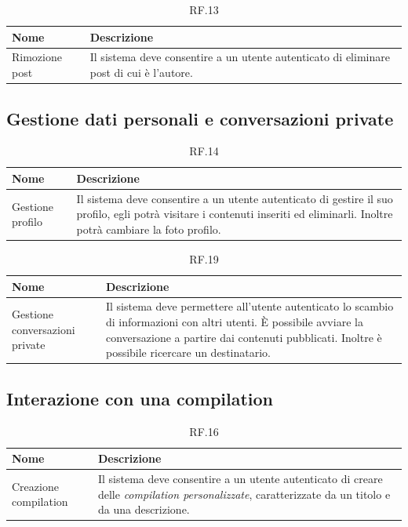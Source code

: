 \documentclass{natourDoc}
\begin{document}
	\begin{table}[H]
		\centering
		\begin{tabular}{ |p{5cm}|p{10.3cm}| }
			\hline
			\rowcolor{PineGreen!70}
			\textbf{Nome} & \textbf{Descrizione} \\
			\hline
			Rimozione post & Il sistema deve consentire a un utente autenticato di eliminare post di cui
			è l'autore. \\
			\hline
		\end{tabular}
		\caption{RF.13}
		\label{table:13}
	\end{table}
	
	\subsection{Gestione dati personali e conversazioni private}
	\begin{table}[H]
		\centering
		\begin{tabular}{ |p{5cm}|p{10.3cm}| } 
			\hline
			\rowcolor{PineGreen!70}
			\textbf{Nome} & \textbf{Descrizione} \\
			\hline
			Gestione profilo &  Il sistema deve consentire a un utente autenticato di gestire il suo profilo, 
			egli potrà visitare i contenuti inseriti ed eliminarli. Inoltre potrà cambiare la foto profilo. \\
			\hline
		\end{tabular}
		\caption{RF.14}
		\label{table:14}
	\end{table}

	\begin{table}[H]
		\centering
		\begin{tabular}{ |p{5cm}|p{10.3cm}| }
			\hline
			\rowcolor{PineGreen!70}
			\textbf{Nome} & \textbf{Descrizione} \\
			\hline
			Gestione conversazioni private & Il sistema deve permettere all'utente autenticato lo scambio di informazioni con altri utenti.
			È possibile avviare la conversazione a partire dai contenuti pubblicati. Inoltre è possibile ricercare un destinatario. \\
			\hline
		\end{tabular}
		\caption{RF.19}
		\label{table:19}
	\end{table}
	
	\subsection{Interazione con una compilation}
	\begin{table}[H]
		\centering
		\begin{tabular}{ |p{5cm}|p{10.3cm}| }
			\hline
			\rowcolor{PineGreen!70}
			\textbf{Nome} & \textbf{Descrizione} \\
			\hline
			Creazione compilation & Il sistema deve consentire a un utente autenticato di creare delle \textit{compilation personalizzate},
			caratterizzate da un titolo e da una descrizione. \\
			\hline
		\end{tabular}
		\caption{RF.16}
		\label{table:16}
	\end{table}
\end{document}
